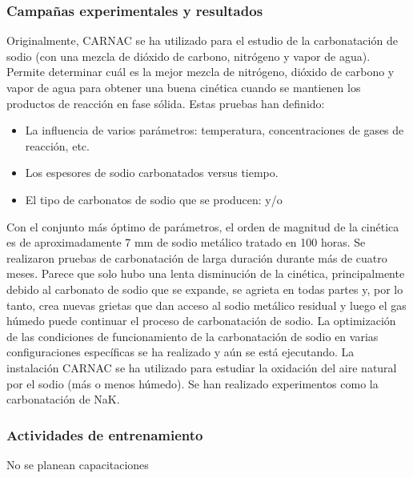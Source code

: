 \documentclass{article}
\begin{document}
\subsubsection*{Campañas experimentales y resultados}
Originalmente, CARNAC se ha utilizado para el estudio de la carbonatación de sodio (con una mezcla de dióxido de carbono, nitrógeno y vapor de agua). Permite determinar cuál es la mejor mezcla de nitrógeno, dióxido de carbono y vapor de agua para obtener una buena cinética cuando se mantienen los productos de reacción en fase sólida. Estas pruebas han definido:
\begin{itemize}
    \item La influencia de varios parámetros: temperatura, concentraciones de gases de reacción, etc.
    \item Los espesores de sodio carbonatados versus tiempo.
    \item El tipo de carbonatos de sodio que se producen:  y/o 
\end{itemize}
Con el conjunto más óptimo de parámetros, el orden de magnitud de la cinética es de aproximadamente 7 mm de sodio metálico tratado en 100 horas. Se realizaron pruebas de carbonatación de larga duración durante más de cuatro meses. Parece que solo hubo una lenta disminución de la cinética, principalmente debido al carbonato de sodio que se expande, se agrieta en todas partes y, por lo tanto, crea nuevas grietas que dan acceso al sodio metálico residual y luego el gas húmedo puede continuar el proceso de carbonatación de sodio.
La optimización de las condiciones de funcionamiento de la carbonatación de sodio en varias configuraciones específicas se ha realizado y aún se está ejecutando. La instalación CARNAC se ha utilizado para estudiar la oxidación del aire natural por el sodio (más o menos húmedo). Se han realizado experimentos como la carbonatación de NaK.

\subsubsection*{Actividades de entrenamiento}
No se planean capacitaciones
\end{document}
